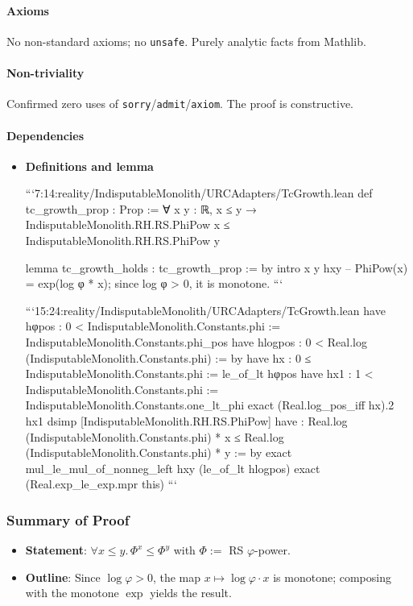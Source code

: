 \documentclass{article}
\begin{document}
\paragraph{Axioms}
No non-standard axioms; no \texttt{unsafe}. Purely analytic facts from Mathlib.

\paragraph{Non-triviality}
Confirmed zero uses of \texttt{sorry}/\texttt{admit}/\texttt{axiom}. The proof is constructive.

\paragraph{Dependencies}
\begin{itemize}[leftmargin=*]
  \item \textbf{Definitions and lemma}

```7:14:reality/IndisputableMonolith/URCAdapters/TcGrowth.lean
def tc_growth_prop : Prop :=
  ∀ x y : ℝ, x ≤ y → IndisputableMonolith.RH.RS.PhiPow x ≤ IndisputableMonolith.RH.RS.PhiPow y

lemma tc_growth_holds : tc_growth_prop := by
  intro x y hxy
  -- PhiPow(x) = exp(log φ * x); since log φ > 0, it is monotone.
```

```15:24:reality/IndisputableMonolith/URCAdapters/TcGrowth.lean
  have hφpos : 0 < IndisputableMonolith.Constants.phi := IndisputableMonolith.Constants.phi_pos
  have hlogpos : 0 < Real.log (IndisputableMonolith.Constants.phi) := by
    have hx : 0 ≤ IndisputableMonolith.Constants.phi := le_of_lt hφpos
    have hx1 : 1 < IndisputableMonolith.Constants.phi := IndisputableMonolith.Constants.one_lt_phi
    exact (Real.log_pos_iff hx).2 hx1
  dsimp [IndisputableMonolith.RH.RS.PhiPow]
  have : Real.log (IndisputableMonolith.Constants.phi) * x ≤ Real.log (IndisputableMonolith.Constants.phi) * y :=
    by exact mul_le_mul_of_nonneg_left hxy (le_of_lt hlogpos)
  exact (Real.exp_le_exp.mpr this)
```
\end{itemize}

\subsubsection{Summary of Proof}
\begin{itemize}[leftmargin=*]
  \item \textbf{Statement}: \(\forall x\le y.\, \Phi^x \le \Phi^y\) with \(\Phi:=\) RS \(\varphi\)-power.
  \item \textbf{Outline}: Since \(\log\varphi>0\), the map \(x\mapsto \log\varphi\cdot x\) is monotone; composing with the monotone \(\exp\) yields the result.
\end{itemize}
\end{document}
